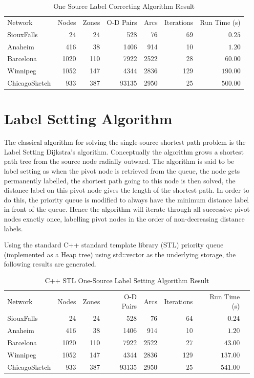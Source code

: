 \begin{table}[H]
    \centering
    \begin{tabular}{lrrrrrr}
        Network & Nodes & Zones & O-D Pairs & Arcs  & Iterations  & Run Time (s) \\ 
        SiouxFalls    & 24   & 24  & 528   & 76      & 69         & $ 0.25 $     \\ 
        Anaheim       & 416  & 38  & 1406  & 914     & 10         & $ 1.20  $     \\
        Barcelona     & 1020 & 110 & 7922  & 2522    & 28         & $ 60.00   $     \\
        Winnipeg      & 1052 & 147 & 4344  & 2836    & 129        & $ 190.00  $     \\
        ChicagoSketch & 933  & 387 & 93135 & 2950    & 25         & $ 500.00  $    
    \end{tabular}
    \caption{One Source Label Correcting Algorithm Result}
\end{table}

\section{Label Setting Algorithm}
\label{section:labelsettingalgorithm}
The classical algorithm for solving the single-source shortest path problem is the Label Setting Dijkstra's algorithm.
Conceptually the algorithm grows a shortest path tree from the source node radially outward.
The algorithm is said to be label setting as when the pivot node is retrieved from the queue,
the node gets permanently labelled,
the shortest path going to this node is then solved,
the distance label on this pivot node gives the length of the shortest path.
In order to do this, 
the priority queue is modified to always have the minimum distance label in front of the queue.
Hence the algorithm will iterate through all successive pivot nodes exactly once,
labelling pivot nodes in the order of non-decreasing distance labels.


Using the standard C++ standard template library (STL) priority queue (implemented as a Heap tree) using std::vector as the underlying storage,
the following results are generated.
\begin{table}[H]
    \centering
    \begin{tabular}{lrrrrrrr}
        Network & Nodes & Zones & O-D Pairs & Arcs  & Iterations & Run Time (s) \\
        SiouxFalls    & 24   & 24  & 528   & 76     & 64         & $ 0.24 $     \\
        Anaheim       & 416  & 38  & 1406  & 914    & 10         & $ 1.20 $     \\
        Barcelona     & 1020 & 110 & 7922  & 2522   & 27         & $ 43.00 $    \\
        Winnipeg      & 1052 & 147 & 4344  & 2836   & 129        & $ 137.00 $   \\
        ChicagoSketch & 933  & 387 & 93135 & 2950   & 25         & $ 541.00 $  
    \end{tabular}
    \caption{C++ STL One-Source Label Setting Algorithm Result}
\end{table}

